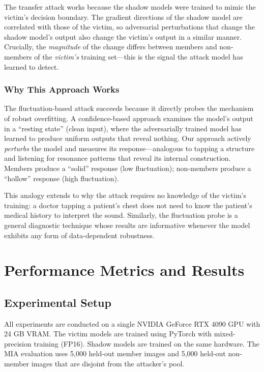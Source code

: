 \documentclass[conference]{IEEEtran}
\begin{document}
The transfer attack works because the shadow models were trained to mimic the victim's decision boundary. The gradient directions of the shadow model are correlated with those of the victim, so adversarial perturbations that change the shadow model's output also change the victim's output in a similar manner. Crucially, the \textit{magnitude} of the change differs between members and non-members of the \textit{victim's} training set---this is the signal the attack model has learned to detect.

\subsubsection{Why This Approach Works}

The fluctuation-based attack succeeds because it directly probes the mechanism of robust overfitting. A confidence-based approach examines the model's output in a ``resting state'' (clean input), where the adversarially trained model has learned to produce uniform outputs that reveal nothing. Our approach actively \textit{perturbs} the model and measures its response---analogous to tapping a structure and listening for resonance patterns that reveal its internal construction. Members produce a ``solid'' response (low fluctuation); non-members produce a ``hollow'' response (high fluctuation).

This analogy extends to why the attack requires no knowledge of the victim's training: a doctor tapping a patient's chest does not need to know the patient's medical history to interpret the sound. Similarly, the fluctuation probe is a general diagnostic technique whose results are informative whenever the model exhibits any form of data-dependent robustness.



\section{Performance Metrics and Results}
\label{sec:results}

\subsection{Experimental Setup}

All experiments are conducted on a single NVIDIA GeForce RTX 4090 GPU with 24 GB VRAM. The victim models are trained using PyTorch with mixed-precision training (FP16). Shadow models are trained on the same hardware. The MIA evaluation uses 5,000 held-out member images and 5,000 held-out non-member images that are disjoint from the attacker's pool.
\end{document}
